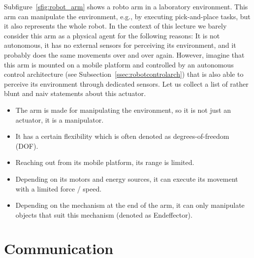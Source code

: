 Subfigure~\ref{sfig:robot_arm} shows a robto arm in a laboratory environment. This arm can manipulate the environment, e.g., by executing pick-and-place tasks, but it also represents the whole robot. In the context of this lecture we barely consider this arm as a physical agent for the following reasons: It is not autonomous, it has no external sensors for perceiving its environment, and it probably does the same movements over and over again. However, imagine that this arm is mounted on a mobile platform and controlled by an autonomous control architecture (see Subsection~\ref{ssec:robotcontrolarch}) that is also able to perceive its environment through dedicated sensors. Let us collect a list of rather blunt and naiv statements about this actuator. 
\begin{itemize}
 \item The arm is made for manipulating the environment, so it is not just an actuator, it is a manipulator.
 \item It has a certain flexibility which is often denoted as degrees-of-freedom (DOF). 
 \item Reaching out from its mobile platform, its range is limited.
 \item Depending on its motors and energy sources, it can execute its movement with a limited force / speed.
 \item Depending on the mechanism at the end of the arm, it can only manipulate objects that suit this mechanism (denoted as Endeffector).
\end{itemize}



\section{Communication}
\label{sec:communication}
